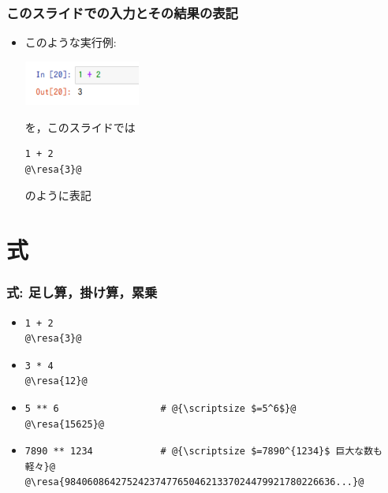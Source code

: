 \documentclass[10pt,dvipdfmx]{beamer}
\newcommand{\ore}[1]{{\color{orange}#1}}
\newcommand{\resa}[1]{\ore{\textsl{$\rightarrow$ #1}}}
\begin{document}
\begin{frame}[fragile]
\frametitle{このスライドでの入力とその結果の表記}
\begin{itemize}
\item このような実行例:

\includegraphics[width=0.3\textwidth]{out/pdf/img/cell_1_plus_2.pdf}

を，このスライドでは
\begin{lstlisting}
1 + 2
@\resa{3}@
\end{lstlisting}
のように表記
\end{itemize}
\end{frame}

\section{式}

\begin{frame}[fragile]
\frametitle{式: 足し算，掛け算，累乗}
\begin{itemize}
\item 
\begin{lstlisting}
1 + 2
@\resa{3}@
\end{lstlisting}

\item 
\begin{lstlisting}
3 * 4
@\resa{12}@
\end{lstlisting}

\item 
\begin{lstlisting}
5 ** 6                  # @{\scriptsize $=5^6$}@
@\resa{15625}@
\end{lstlisting}

\item 
\begin{lstlisting}
7890 ** 1234            # @{\scriptsize $=7890^{1234}$ 巨大な数も軽々}@
@\resa{984060864275242374776504621337024479921780226636...}@
\end{lstlisting}
\end{itemize}
\end{frame}
\end{document}
